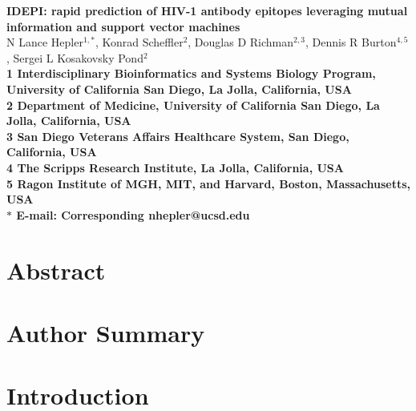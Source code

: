 \documentclass[10pt]{article}
\date{}
\newcommand{\idepi}{{IDEPI}}
\newcommand{\hiv}{{HIV}-1}
\begin{document}
\begin{flushleft}
{\Large
\textbf{\idepi{}: rapid prediction of \hiv{} antibody epitopes leveraging mutual information and support vector machines}
}
\\
N Lance Hepler$^{1,\ast}$,
Konrad Scheffler$^{2}$,
Douglas D Richman$^{2,3}$,
Dennis R Burton$^{4,5}$,
Sergei L Kosakovsky Pond$^{2}$
\\
\bf{1} Interdisciplinary Bioinformatics and Systems Biology Program, University of California San Diego, La Jolla, California, USA
\\
\bf{2} Department of Medicine, University of California San Diego, La Jolla, California, USA
\\
\bf{3} San Diego Veterans Affairs Healthcare System, San Diego, California, USA
\\
\bf{4} The Scripps Research Institute, La Jolla, California, USA
\\
\bf{5} Ragon Institute of {MGH}, {MIT}, and Harvard, Boston, Massachusetts, USA
\\
$\ast$ E-mail: Corresponding nhepler@ucsd.edu
\end{flushleft}

\section*{Abstract}

\section*{Author Summary}

\section*{Introduction}
\end{document}
